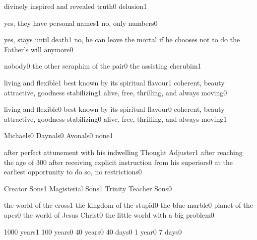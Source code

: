 {divinely inspired and revealed truth}{0}
{delusion}{1}
\qstop

{yes, they have personal names}{1}
{no, only numbers}{0}
\qstop

{yes, stays until death}{1}
{no, he can leave the mortal if he chooses not to do the Father's will anymore}{0}
\qstop

{nobody}{0}
{the other seraphim of the pair}{0}
{the assisting cherubim}{1}
\qstop

{living and flexible}{1}
{best known by its spiritual flavour}{1}
{coherent, beauty attractive, goodness stabilizing}{1}
{alive, free, thrilling, and always moving}{0}
\qstop

{living and flexible}{0}
{best known by its spiritual flavour}{0}
{coherent, beauty attractive, goodness stabilizing}{0}
{alive, free, thrilling, and always moving}{1}
\qstop

{Michaels}{0}
{Daynals}{0}
{Avonals}{0}
{none}{1}
\qstop

{after perfect attunement with his indwelling Thought Adjuster}{1}
{after reaching the age of 30}{0}
{after receiving explicit instruction from his superiors}{0}
{at the earliest opportunity to do so, no restrictions}{0}
\qstop

{Creator Sons}{1}
{Magisterial Sons}{1}
{Trinity Teacher Sons}{0}
\qstop

{the world of the cross}{1}
{the kingdom of the stupid}{0}
{the blue marble}{0}
{planet of the apes}{0}
{the world of Jesus Christ}{0}
{the little world with a big problem}{0}
\qstop

{1000 years}{1}
{100 years}{0}
{40 years}{0}
{40 days}{0}
{1 year}{0}
{7 days}{0}
\qstop

